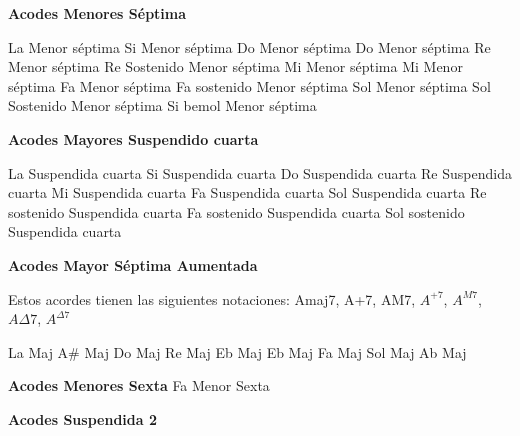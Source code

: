 \vskip 20pt
\textbf{Acodes Menores S\'eptima}

\small
\upchord{\AmsevenGuitar}La Menor s\'eptima \hfill
\upchord{\BmsevenGuitar}Si Menor s\'eptima \hfill
\upchord{\CmsevenGuitar}Do Menor s\'eptima \hfill
\upchord{\CsmsevenGuitar}Do Menor s\'eptima \hfill\null\break
\vskip 20pt
\upchord{\DmsevenGuitar}Re Menor s\'eptima \hfill
\upchord{\DsmsevenGuitar}Re Sostenido Menor s\'eptima \hfill
\upchord{\EmsevenGuitar}Mi Menor s\'eptima \hfill
\upchord{\EmseventrGuitar}Mi Menor s\'eptima \hfill\null\break
\vskip 20pt
\upchord{\FmsevenGuitar}Fa Menor s\'eptima \hfill
\upchord{\FsmsevenGuitar}Fa sostenido Menor s\'eptima \hfill
\upchord{\GmsevenGuitar}Sol Menor s\'eptima \hfill
\upchord{\GsmsevenGuitar}Sol Sostenido Menor s\'eptima \hfill\null\break
\vskip 20pt
\upchord{\BflatmsevenGuitar}Si bemol Menor s\'eptima \hfill\null\break
\normalsize

\vskip 20pt
\textbf{Acodes Mayores Suspendido cuarta}
\vskip 25pt

\small
\upchord{\AsusGuitar}La Suspendida cuarta \hfill
\upchord{\BsusGuitar}Si Suspendida cuarta \hfill
\upchord{\CsusGuitar}Do Suspendida cuarta \hfill\null\break
\vskip 20pt
\upchord{\DsusGuitar}Re Suspendida cuarta \hfill
\upchord{\EsusGuitar}Mi Suspendida cuarta \hfill
\upchord{\FsusGuitar}Fa Suspendida cuarta \hfill\null\break
\vskip 20pt
\upchord{\GsusGuitar}Sol Suspendida cuarta \hfill
\upchord{\DsusGuitar}Re sostenido Suspendida cuarta \hfill
\upchord{\FssusGuitar}Fa sostenido Suspendida cuarta \hfill\null\break
\vskip 20pt
\upchord{\GssusGuitar}Sol sostenido Suspendida cuarta \hfill\null\break
\normalsize

\vskip 20pt
\textbf{Acodes Mayor S\'eptima Aumentada}
\vskip 25pt

Estos acordes tienen las siguientes notaciones:
Amaj7, A+7, AM7, $A^{+7}$, $A^{M7}$, $A\Delta7$, $A^{\Delta7}$\break
\vskip 20pt

\small
\upchord{\AMajGuitar}La Maj \hfill
\upchord{\AsMajGuitar}A\# Maj \hfill
\upchord{\CMajGuitar}Do Maj \hfill
\upchord{\DMajGuitar}Re Maj \hfill
\upchord{\EflatMajGuitar}Eb Maj \hfill\null\break
\vskip 20pt
\upchord{\EMajGuitar}Eb Maj \hfill
\upchord{\FMajGuitar}Fa Maj \hfill
\upchord{\GMajGuitar}Sol Maj \hfill
\upchord{\AflatMajGuitar}Ab Maj \hfill\null\break
\normalsize

\vskip 20pt
\textbf{Acodes Menores Sexta}
\vskip 25pt
\small
\upchord{\FmsixGuitar}\qquad Fa Menor Sexta \hfill
\normalsize

\vskip 20pt
\textbf{Acodes Suspendida 2}
\vskip 25pt

